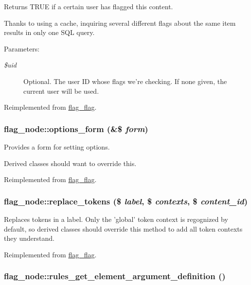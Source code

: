 Returns TRUE if a certain user has flagged this content.

Thanks to using a cache, inquiring several different flags about the same item results in only one SQL query.

\begin{Desc}
\item[Parameters:]
\begin{description}
\item[{\em \$uid}]Optional. The user ID whose flags we're checking. If none given, the current user will be used. \end{description}
\end{Desc}


Reimplemented from \hyperlink{classflag__flag_82aa6ee546607848f4df8688bfaf93bc}{flag\_\-flag}.\hypertarget{classflag__node_5130212d8df4885b0fc5bcace0f6345d}{
\subsubsection[{options\_\-form}]{\setlength{\rightskip}{0pt plus 5cm}flag\_\-node::options\_\-form (\&\$ {\em form})}}
\label{classflag__node_5130212d8df4885b0fc5bcace0f6345d}


Provides a form for setting options.

Derived classes should want to override this. 

Reimplemented from \hyperlink{classflag__flag_28aec91da5bc068c6c2a9a707ef62345}{flag\_\-flag}.\hypertarget{classflag__node_38932e35c8b4b0191a118ffde9c27d97}{
\subsubsection[{replace\_\-tokens}]{\setlength{\rightskip}{0pt plus 5cm}flag\_\-node::replace\_\-tokens (\$ {\em label}, \/  \$ {\em contexts}, \/  \$ {\em content\_\-id})}}
\label{classflag__node_38932e35c8b4b0191a118ffde9c27d97}


Replaces tokens in a label. Only the 'global' token context is regognized by default, so derived classes should override this method to add all token contexts they understand. 

Reimplemented from \hyperlink{classflag__flag_6fa61cada1cb5f94c64b3037fdd28da1}{flag\_\-flag}.\hypertarget{classflag__node_cb9a883b4910f72b836875066fc31c2c}{
\subsubsection[{rules\_\-get\_\-element\_\-argument\_\-definition}]{\setlength{\rightskip}{0pt plus 5cm}flag\_\-node::rules\_\-get\_\-element\_\-argument\_\-definition ()}}
\label{classflag__node_cb9a883b4910f72b836875066fc31c2c}


